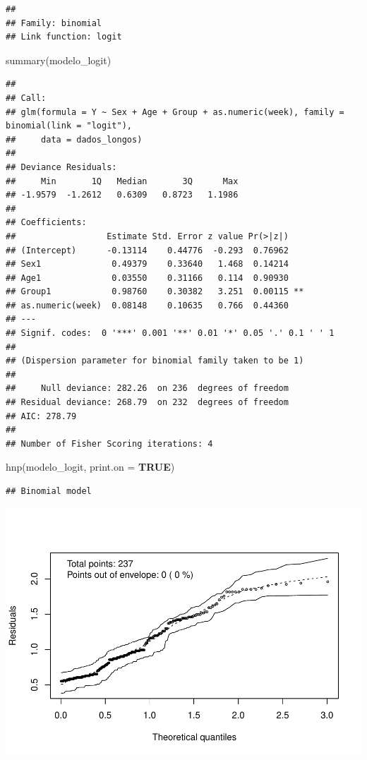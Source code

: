 \documentclass[
]{article}
\newenvironment{Shaded}{\begin{snugshade}}{\end{snugshade}}
\newcommand{\AttributeTok}[1]{\textcolor[rgb]{0.80,0.80,0.80}{#1}}
\newcommand{\ConstantTok}[1]{\textcolor[rgb]{0.86,0.64,0.64}{\textbf{#1}}}
\newcommand{\FunctionTok}[1]{\textcolor[rgb]{0.94,0.94,0.56}{#1}}
\newcommand{\NormalTok}[1]{\textcolor[rgb]{0.80,0.80,0.80}{#1}}
\begin{document}
\begin{verbatim}
## 
## Family: binomial 
## Link function: logit
\end{verbatim}

\begin{Shaded}
\begin{Highlighting}[]
\FunctionTok{summary}\NormalTok{(modelo\_logit)}
\end{Highlighting}
\end{Shaded}

\begin{verbatim}
## 
## Call:
## glm(formula = Y ~ Sex + Age + Group + as.numeric(week), family = binomial(link = "logit"), 
##     data = dados_longos)
## 
## Deviance Residuals: 
##     Min       1Q   Median       3Q      Max  
## -1.9579  -1.2612   0.6309   0.8723   1.1986  
## 
## Coefficients:
##                  Estimate Std. Error z value Pr(>|z|)   
## (Intercept)      -0.13114    0.44776  -0.293  0.76962   
## Sex1              0.49379    0.33640   1.468  0.14214   
## Age1              0.03550    0.31166   0.114  0.90930   
## Group1            0.98760    0.30382   3.251  0.00115 **
## as.numeric(week)  0.08148    0.10635   0.766  0.44360   
## ---
## Signif. codes:  0 '***' 0.001 '**' 0.01 '*' 0.05 '.' 0.1 ' ' 1
## 
## (Dispersion parameter for binomial family taken to be 1)
## 
##     Null deviance: 282.26  on 236  degrees of freedom
## Residual deviance: 268.79  on 232  degrees of freedom
## AIC: 278.79
## 
## Number of Fisher Scoring iterations: 4
\end{verbatim}

\begin{Shaded}
\begin{Highlighting}[]
\FunctionTok{hnp}\NormalTok{(modelo\_logit, }\AttributeTok{print.on =} \ConstantTok{TRUE}\NormalTok{)}
\end{Highlighting}
\end{Shaded}

\begin{verbatim}
## Binomial model
\end{verbatim}

\includegraphics{EDA__files/figure-latex/unnamed-chunk-10-1.pdf}
\end{document}
